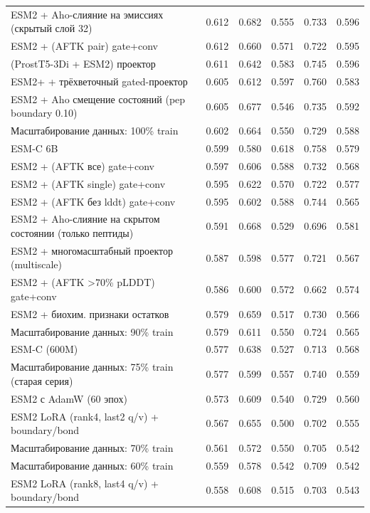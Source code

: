 \begin{longtable}{p{7.2cm} r r r r r}
ESM2 + Aho-слияние на эмиссиях (скрытый слой 32) & 0.612 & 0.682 & 0.555 & 0.733 & 0.596 \\
ESM2 + (AFTK pair) gate+conv & 0.612 & 0.660 & 0.571 & 0.722 & 0.595 \\
(ProstT5-3Di + ESM2) проектор & 0.611 & 0.642 & 0.583 & 0.745 & 0.596 \\
ESM2+ + трёхветочный gated-проектор & 0.605 & 0.612 & 0.597 & 0.760 & 0.583 \\
ESM2 + Aho смещение состояний (pep boundary 0.10) & 0.605 & 0.677 & 0.546 & 0.735 & 0.592 \\
Масштабирование данных: 100\% train & 0.602 & 0.664 & 0.550 & 0.729 & 0.588 \\
ESM-C 6B & 0.599 & 0.580 & 0.618 & 0.758 & 0.579 \\
ESM2 + (AFTK все) gate+conv & 0.597 & 0.606 & 0.588 & 0.732 & 0.568 \\
ESM2 + (AFTK single) gate+conv & 0.595 & 0.622 & 0.570 & 0.722 & 0.577 \\
ESM2 + (AFTK без lddt) gate+conv & 0.595 & 0.602 & 0.588 & 0.744 & 0.565 \\
ESM2 + Aho-слияние на скрытом состоянии (только пептиды) & 0.591 & 0.668 & 0.529 & 0.696 & 0.581 \\
ESM2 + многомасштабный проектор (multiscale) & 0.587 & 0.598 & 0.577 & 0.721 & 0.567 \\
ESM2 + (AFTK \textgreater{}70\% pLDDT) gate+conv & 0.586 & 0.600 & 0.572 & 0.662 & 0.574 \\
ESM2 + биохим. признаки остатков & 0.579 & 0.659 & 0.517 & 0.730 & 0.566 \\
Масштабирование данных: 90\% train & 0.579 & 0.611 & 0.550 & 0.724 & 0.565 \\
ESM-C (600M) & 0.577 & 0.638 & 0.527 & 0.713 & 0.568 \\
Масштабирование данных: 75\% train (старая серия) & 0.577 & 0.599 & 0.557 & 0.740 & 0.559 \\
ESM2 с AdamW (60 эпох) & 0.573 & 0.609 & 0.540 & 0.729 & 0.560 \\
ESM2 LoRA (rank4, last2 q/v) + boundary/bond & 0.567 & 0.655 & 0.500 & 0.702 & 0.555 \\
Масштабирование данных: 70\% train & 0.561 & 0.572 & 0.550 & 0.705 & 0.542 \\
Масштабирование данных: 60\% train & 0.559 & 0.578 & 0.542 & 0.709 & 0.542 \\
ESM2 LoRA (rank8, last4 q/v) + boundary/bond & 0.558 & 0.608 & 0.515 & 0.703 & 0.543 \\

\end{longtable}
